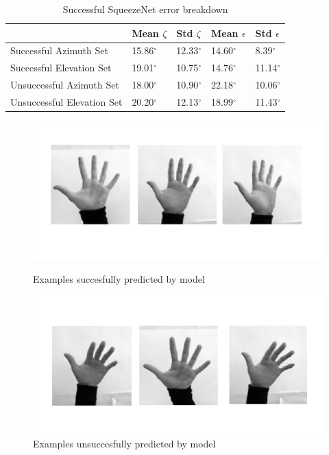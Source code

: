 \documentclass{article}
\begin{document}
{\begin{table}[h!]
  \begin{center}
    \caption{Successful SqueezeNet error breakdown}
    \label{tab:tablebreakdown}
    \begin{tabular}{l|l|l|l|l}
      \textbf{} & \textbf{Mean $\zeta$} &  \textbf{Std $\zeta$} & \textbf{Mean $\epsilon$} &  \textbf{Std $\epsilon$}  \\
      \hline
      Successful Azimuth Set & 15.86$^{\circ}$ & 12.33$^{\circ}$& 14.60$^{\circ}$ & 8.39$^{\circ}$ \\
      Successful Elevation Set & 19.01$^{\circ}$  & 10.75$^{\circ}$ & 14.76$^{\circ}$ & 11.14$^{\circ}$\\
      Unsuccessful Azimuth Set & 18.00$^{\circ}$ & 10.90$^{\circ}$ & 22.18$^{\circ}$ & 10.06$^{\circ}$\\
      Unsuccessful Elevation Set & 20.20$^{\circ}$  & 12.13$^{\circ}$& 18.99$^{\circ}$ & 11.43$^{\circ}$\\
    \end{tabular}
  \end{center}
\end{table}

\begin{figure}[h]
 \hspace*{0cm}
  \includegraphics[scale=0.6]{goodz.pdf}
   \vspace*{-21mm}
  \caption{Examples succesfully predicted by model}
  \label{fig:goodz}

\hspace*{0cm}
  \includegraphics[scale=0.6]{badz.pdf}
  \vspace*{-18mm}
  \caption{Examples unsuccesfully predicted by model}
  \label{fig:badz}


\end{figure}}
\end{document}
